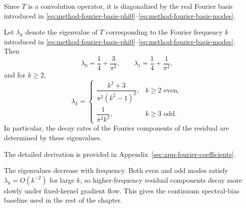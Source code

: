 Since \(T\) is a convolution operator, it is diagonalized by the real Fourier basis
introduced in \eqref{eq:method-fourier-basis-phi0}--\eqref{eq:method-fourier-basis-modes}.

\begin{theorem}
	\label{thm:results-continuum-spectrum}
	Let \(\lambda_k\) denote the eigenvalue of \(T\) corresponding to the
	Fourier frequency \(k\) introduced in
	\eqref{eq:method-fourier-basis-phi0}--\eqref{eq:method-fourier-basis-modes}.
	Then
	\begin{equation}
		\lambda_0=\frac{1}{4}+\frac{3}{\pi^2},
		\qquad
		\lambda_1=\frac{1}{4}+\frac{1}{\pi^2},
		\label{eq:results-lambda-0-1}
	\end{equation}
	and for \(k\geq 2\),
	\begin{equation}
		\lambda_k=
		\begin{cases}
			\dfrac{k^2+3}{\pi^2(k^2-1)^2}, & k \ge 2 \text{ even}, \\[1em]
			\dfrac{1}{\pi^2 k^2},          & k \ge 3 \text{ odd}.
		\end{cases}
		\label{eq:results-lambda-k}
	\end{equation}
	In particular, the decay rates of the Fourier components of the residual are determined by
	these eigenvalues.
\end{theorem}

The detailed derivation is provided in Appendix~\ref{sec:app-fourier-coefficients}.

The eigenvalues decrease with frequency. Both even and odd modes satisfy
\(\lambda_k=O(k^{-2})\) for large \(k\), so higher-frequency residual
components decay more slowly under fixed-kernel gradient flow. This gives the
continuum spectral-bias baseline used in the rest of the chapter.

